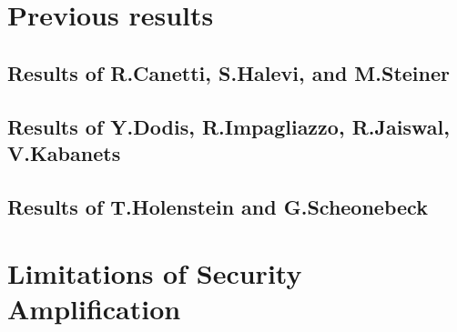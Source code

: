 \documentclass[11pt,a4paper,titlepage]{memoir}
\begin{document}

\section{Previous results}
\label{st:previous_results}
\subsection{Results of R.Canetti, S.Halevi, and M.Steiner}
\subsection{Results of Y.Dodis, R.Impagliazzo, R.Jaiswal, V.Kabanets}
\subsection{Results of T.Holenstein and G.Scheonebeck}
\section{Limitations of Security Amplification}



\appendix


\backmatter



\end{document}
